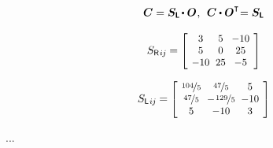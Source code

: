 \begin{otherlanguage}{russian}
\begin{tcolorbox}
\begin{equation*}\begin{array}{c}
\bm{C} = \bm{S_{\smash{\mathsf{L}}}} \hspace{-0.25ex} \dotp \rotationtensor
\hspace{.1ex} , \:\:
\bm{C} \dotp \rotationtensor^{\T}\hspace{-0.5ex} = \bm{S_{\smash{\mathsf{L}}}}
\end{array}\end{equation*}

\begin{equation*}
S_{\smash{\mathsf{R}}\hspace{.15ex}i\hspace{-0.1ex}j} \hspace{-0.1ex} =
\scalebox{0.92}[0.92]{$\left[\hspace{-0.2ex}\begin{array}{c@{\hspace{.6em}}c@{\hspace{.6em}}c}
3 & 5 & -10 \\
5 & 0 & 25 \\
-10 & 25 & -5
\end{array}\hspace{-0.2ex}\right]$}
\end{equation*}

\begin{equation*}
S_{\smash{\mathsf{L}}\hspace{.15ex}i\hspace{-0.1ex}j} \hspace{-0.1ex} =
\scalebox{0.92}[0.92]{$\left[\hspace{-0.2ex}\begin{array}{c@{\hspace{.6em}}c@{\hspace{.6em}}c}
\nicefrac{104}{5} & \nicefrac{47}{5} & 5 \\
\nicefrac{47}{5} & - \hspace{.2ex} \nicefrac{129}{5} & -10 \\
5 & -10 & 3
\end{array}\hspace{-0.2ex}\right]$}
\end{equation*}

\par\end{tcolorbox}

...


\end{otherlanguage}


